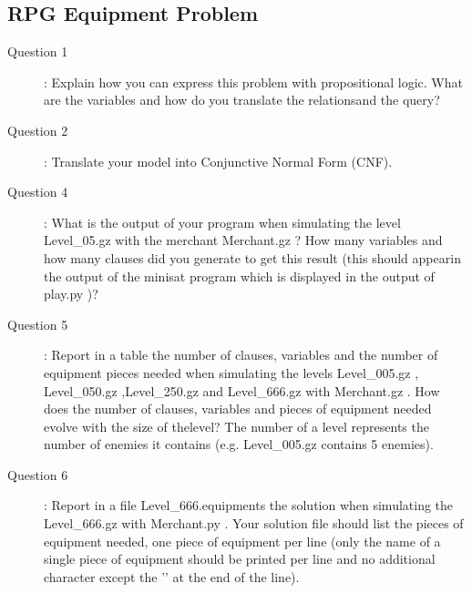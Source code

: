 \subsection{RPG Equipment Problem}
\begin{description}
\item[Question 1]: Explain how you can express this problem with propositional logic. What are the variables and how do you translate the relationsand the query?\\

\item[Question 2]: Translate your model into Conjunctive Normal Form (CNF).\\

\item[Question 4]: What is the output of your program when simulating the level Level_05.gz with the merchant Merchant.gz ? How many variables and how many clauses did you generate to get this result (this should appearin the output of the minisat program which is displayed in the output of play.py )?\\

\item[Question 5]: Report in a table the number of clauses, variables and the number of equipment pieces needed when simulating the levels Level_005.gz , Level_050.gz ,Level_250.gz and Level_666.gz with Merchant.gz . How does the number of clauses, variables and pieces of equipment needed evolve with the size of thelevel? The number of a level represents the number of enemies it contains (e.g. Level_005.gz contains 5 enemies).\\

\item[Question 6]: Report in a file Level_666.equipments the solution when simulating the Level_666.gz with Merchant.py . Your solution file should list the pieces of equipment needed, one piece of equipment per line (only the name of a single piece of equipment should be printed per line and no additional character except the ’\n’ at the end of the line).\\


\end{description}



